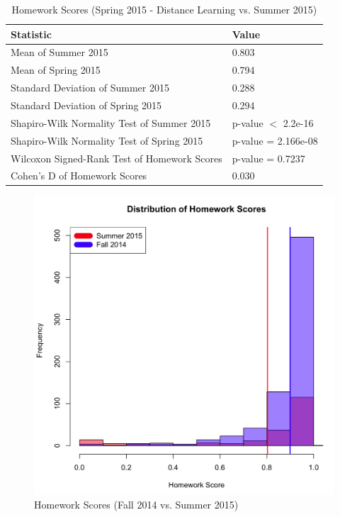 \pagebreak\clearpage

\begin{small}
\begin{table}
  \centering
  \begin{tabular}{|l|l|}
    \hline
    \textbf{Statistic} & \textbf{Value} \\
	\hline
	Mean of Summer 2015 & 0.803 \\
	\hline
	Mean of Spring 2015 & 0.794 \\
	\hline
	Standard Deviation of Summer 2015 & 0.288 \\
	\hline
	Standard Deviation of Spring 2015 & 0.294 \\
	\hline
	Shapiro-Wilk Normality Test of Summer 2015 & p-value $<$ 2.2e-16 \\
	\hline
	Shapiro-Wilk Normality Test of Spring 2015 & p-value = 2.166e-08 \\
	\hline
	Wilcoxon Signed-Rank Test of Homework Scores & p-value = 0.7237 \\
	\hline
	Cohen's D of Homework Scores & 0.030 \\
	\hline
  \end{tabular}
	\caption{Homework Scores (Spring 2015 - Distance Learning vs. Summer 2015)}
  \label{fig:hwSp15dSu15}
\end{table}
\end{small}

\pagebreak\clearpage

\begin{figure}
	\centering
	\includegraphics[width=5in]{img/chapter4/hw_su15_vs_f14}
	\caption{Homework Scores (Fall 2014 vs. Summer 2015)}
  \label{fig:hwFa14Su15}
\end{figure}

